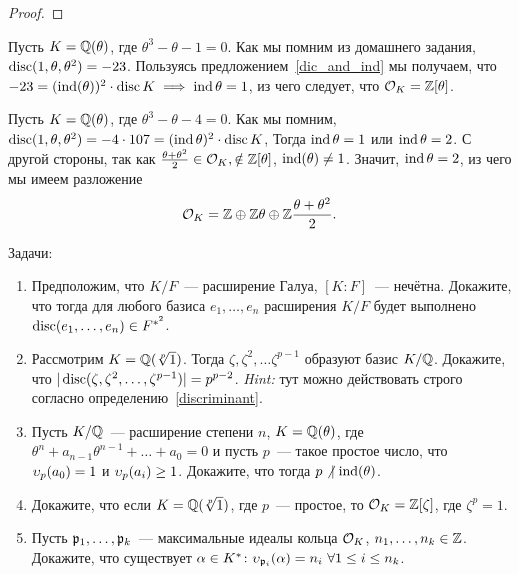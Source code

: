 \begin{definition}
\begin{proof}
		\end{proof}

		\begin{example}
			Пусть $K = \mathbb{Q}(\theta)$, где $\theta^3 - \theta - 1 = 0$. Как мы помним из домашнего задания, $\operatorname{disc}(1, \theta, \theta^2) = -23$.  Пользуясь предложением~\ref{dic_and_ind} мы получаем, что $-23 = (\operatorname{ind}(\theta))^2 \cdot \operatorname{disc}{K} \implies \operatorname{ind}{\theta} = 1$, из чего следует, что $\mathcal{O}_{K} = \mathbb{Z}[\theta]$.
		\end{example}

		\begin{example}
			Пусть $K = \mathbb{Q}(\theta)$, где $\theta^3 - \theta - 4 = 0$. Как мы помним, $\operatorname{disc}(1, \theta, \theta^2) = -4 \cdot 107 = (\operatorname{ind}{\theta})^2 \cdot \operatorname{disc}{K}$, Тогда $\operatorname{ind}{\theta} = 1$ или $\operatorname{ind}{\theta} = 2$. С другой стороны, так как $\frac{\theta + \theta^2}{2} \in \mathcal{O}_{K}, \notin \mathbb{Z}[\theta]$, $\operatorname{ind}(\theta) \neq 1$. Значит, $\operatorname{ind}{\theta} = 2$,  из чего мы имеем разложение 
			\[
				\mathcal{O}_{K} = \mathbb{Z} \oplus \mathbb{Z}\theta \oplus \mathbb{Z} \frac{\theta + \theta^2}{2}.
			\]
		\end{example}

		\begin{homework}\label{hw_4}
			Задачи:
			\begin{enumerate}
				\item Предположим, что $K/F$~--- расширение Галуа, $[K : F]$~--- нечётна. Докажите, что тогда 
				для любого базиса $e_1, \ldots, e_n$ расширения $K/F$ будет выполнено $\operatorname{disc}(e_1, \ldots, e_n) \in F^{*^{2}}$.

				\item Рассмотрим $K = \mathbb{Q}(\sqrt[p]{1})$. Тогда $\zeta, \zeta^2, \ldots \zeta^{p - 1}$ образуют базис $K/\mathbb{Q}$. Докажите, что $|\operatorname{disc}(\zeta, \zeta^2, \ldots, \zeta^{p - 1})| = p^{p - 2}$.
				\emph{Hint:} тут можно действовать строго согласно определению~\ref{discriminant}.

				\item Пусть $K/\mathbb{Q}$~--- расширение степени $n$, $K = \mathbb{Q}(\theta)$, где $\theta^n + a_{n - 1}\theta^{n - 1} + \ldots + a_0 = 0$ и пусть $p$~--- такое простое число, что $\upsilon_{p}(a_0) = 1$ и $\upsilon_{p}(a_i) \ge 1$. Докажите, что тогда $p \not \ \mid \operatorname{ind}(\theta)$.

				\item Докажите, что если $K = \mathbb{Q}(\sqrt[p]{1})$, где $p$~--- простое, то $\mathcal{O}_{K} = \mathbb{Z}[\zeta]$, где $\zeta^p = 1$.

				\item Пусть $\mathfrak{p}_{1}, \ldots, \mathfrak{p}_{k}$~--- максимальные идеалы кольца $\mathcal{O}_{K}$, $n_{1}, \ldots, n_{k} \in \mathbb{Z}$. Докажите, что существует $\alpha \in K^{*}\colon \upsilon_{\mathfrak{p}_{i}}(\alpha) = n_{i} \ \forall 1 \le i \le n_{k}$.


\end{enumerate}
\end{homework}
\end{definition}
